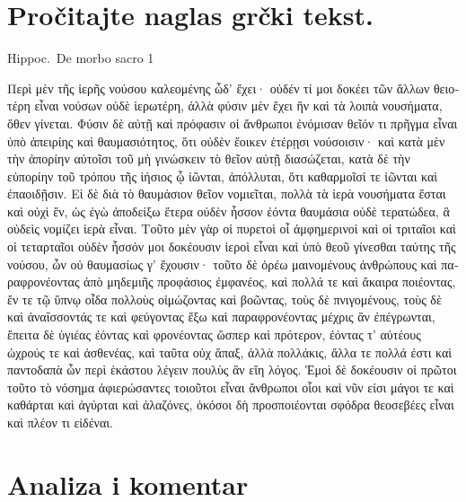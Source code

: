 
\section*{Pročitajte naglas grčki tekst.}

Hippoc.\ De morbo sacro 1


\medskip


{\large

\begin{greek}

\noindent Περὶ μὲν τῆς ἱερῆς νούσου καλεομένης ὧδ’ ἔχει· οὐδέν τί μοι δοκέει τῶν ἄλλων θειοτέρη εἶναι νούσων οὐδὲ ἱερωτέρη, ἀλλὰ φύσιν μὲν ἔχει ἣν καὶ τὰ λοιπὰ νουσήματα, ὅθεν γίνεται. Φύσιν δὲ αὐτῇ καὶ πρόφασιν οἱ ἄνθρωποι ἐνόμισαν θεῖόν τι πρῆγμα εἶναι ὑπὸ ἀπειρίης καὶ θαυμασιότητος, ὅτι οὐδὲν ἔοικεν ἑτέρῃσι νούσοισιν· καὶ κατὰ μὲν τὴν ἀπορίην αὐτοῖσι τοῦ μὴ γινώσκειν τὸ θεῖον αὐτῇ διασώζεται, κατὰ δὲ τὴν εὐπορίην τοῦ τρόπου τῆς ἰήσιος ᾧ ἰῶνται, ἀπόλλυται, ὅτι καθαρμοῖσί τε ἰῶνται καὶ ἐπαοιδῇσιν. Εἰ δὲ διὰ τὸ θαυμάσιον θεῖον νομιεῖται, πολλὰ τὰ ἱερὰ νουσήματα ἔσται καὶ οὐχὶ ἕν, ὡς ἐγὼ ἀποδείξω ἕτερα οὐδὲν ἧσσον ἐόντα θαυμάσια οὐδὲ τερατώδεα, ἃ οὐδεὶς νομίζει ἱερὰ εἶναι. Τοῦτο μὲν γὰρ οἱ πυρετοὶ οἷ ἀμφημερινοὶ καὶ οἱ τριταῖοι καὶ οἱ τεταρταῖοι οὐδὲν ἧσσόν μοι δοκέουσιν ἱεροὶ εἶναι καὶ ὑπὸ θεοῦ γίνεσθαι ταύτης τῆς νούσου, ὧν οὐ θαυμασίως γ’ ἔχουσιν· τοῦτο δὲ ὁρέω μαινομένους ἀνθρώπους καὶ παραφρονέοντας ἀπὸ μηδεμιῆς προφάσιος ἐμφανέος, καὶ πολλά τε καὶ ἄκαιρα ποιέοντας, ἔν τε τῷ ὕπνῳ οἶδα πολλοὺς οἰμώζοντας καὶ βοῶντας, τοὺς δὲ πνιγομένους, τοὺς δὲ καὶ ἀναΐσσοντάς τε καὶ φεύγοντας ἔξω καὶ παραφρονέοντας μέχρις ἂν ἐπέγρωνται, ἔπειτα δὲ ὑγιέας ἐόντας καὶ φρονέοντας ὥσπερ καὶ πρότερον, ἐόντας τ’ αὐτέους ὠχρούς τε καὶ ἀσθενέας, καὶ ταῦτα οὐχ ἅπαξ, ἀλλὰ πολλάκις, ἄλλα τε πολλά ἐστι καὶ παντοδαπὰ ὧν περὶ ἑκάστου λέγειν πουλὺς ἂν εἴη λόγος. Ἐμοὶ δὲ δοκέουσιν οἱ πρῶτοι τοῦτο τὸ νόσημα ἀφιερώσαντες τοιοῦτοι εἶναι ἄνθρωποι οἷοι καὶ νῦν εἰσι μάγοι τε καὶ καθάρται καὶ ἀγύρται καὶ ἀλαζόνες, ὁκόσοι δὴ προσποιέονται σφόδρα θεοσεβέες εἶναι καὶ πλέον τι εἰδέναι.

\end{greek}

}


\section*{Analiza i komentar}

